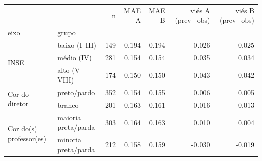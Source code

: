 \begin{tabular}{llrrrrr}
\toprule
 &  & n & MAE A & MAE B & viés A (prev−obs) & viés B (prev−obs) \\
eixo & grupo &  &  &  &  &  \\
\midrule
\multirow[t]{3}{*}{INSE} & baixo (I–III) & 149 & 0.194 & 0.194 & -0.026 & -0.025 \\
 & médio (IV) & 281 & 0.154 & 0.154 & 0.035 & 0.034 \\
 & alto (V–VIII) & 174 & 0.150 & 0.150 & -0.043 & -0.042 \\
\cline{1-7}
\multirow[t]{2}{*}{Cor do diretor} & preto/pardo & 352 & 0.154 & 0.155 & 0.006 & 0.005 \\
 & branco & 201 & 0.163 & 0.161 & -0.016 & -0.013 \\
\cline{1-7}
\multirow[t]{2}{*}{Cor do(s) professor(es)} & maioria preta/parda & 303 & 0.164 & 0.163 & 0.010 & 0.004 \\
 & minoria preta/parda & 212 & 0.158 & 0.159 & -0.030 & -0.019 \\
\cline{1-7}
\bottomrule
\end{tabular}
